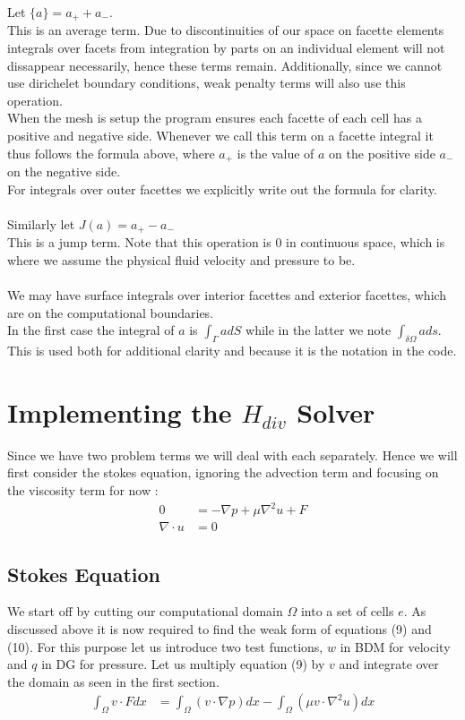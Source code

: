 \documentclass[11pt,twoside,a4paper]{article}
\begin{document}
Let $\{ a \} = a_+ + a_-$. \\
This is an average term. Due to discontinuities of our space on facette elements integrals over facets from integration by parts on an individual element will not dissappear necessarily, hence these terms remain. Additionally, since we cannot use dirichelet boundary conditions, weak penalty terms will also use this operation.\\
When the mesh is setup the program ensures each facette of each cell has a positive and negative side. Whenever we call this term on a facette integral it thus follows the formula above, where $a_+$ is the value of $a$ on the positive side $a_-$ on the negative side.\\
For integrals over outer facettes we explicitly write out the formula for clarity.\\
\\
Similarly let $J(a) = a_+ - a_-$\\
This is a jump term. Note that this operation is $0$ in continuous space, which is where we assume the physical fluid velocity and pressure to be.\\
\\
We may have surface integrals over interior facettes and exterior facettes, which are on the computational boundaries.\\
In the first case the integral of $a$ is $\int_\Gamma a dS$ while in the latter we note $\int_{\delta \Omega} a ds$.\\
This is used both for additional clarity and because it is the notation in the code.


\section{Implementing the $H_{div}$ Solver}
Since we have two problem terms we will deal with each separately. Hence we will first consider the stokes equation, ignoring the advection term and focusing on the viscosity term for now :
\begin{align}
0 &= -\nabla p + \mu \nabla^2 u + F  \\
\nabla \cdot u &= 0
\end{align}

\subsection{Stokes Equation}
We start off by cutting our computational domain $\Omega$ into a set of cells $e$. As discussed above it is now required to find the weak form of equations (9) and (10).
For this purpose let us introduce two test functions, $w$ in BDM for velocity and $q$ in DG for pressure.
Let us multiply equation (9) by $v$ and integrate over the domain as seen in the first section.
\begin{align*}
\int_\Omega v \cdot F dx &= \int_\Omega (v \cdot \nabla p) dx - \int_\Omega (\mu v \cdot \nabla^2 u) dx
\end{align*}
\end{document}

